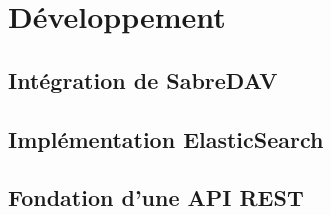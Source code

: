 \section{Développement}

\subsection{Intégration de SabreDAV}

\subsection{Implémentation ElasticSearch}

\subsection{Fondation d'une API REST}

